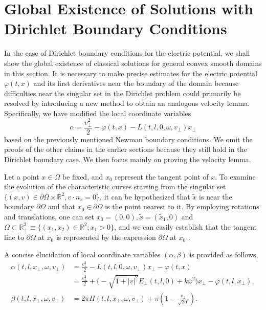 \documentclass[11pt,reqno]{amsart}%
\theoremstyle{definition}
\theoremstyle{remark}
\begin{document}
\section{Global Existence of Solutions with Dirichlet Boundary Conditions}

In the case of Dirichlet boundary conditions for the electric potential, we shall show the global existence of classical solutions for general convex smooth domains in this section. It is necessary to make precise estimates for the electric potential $ \varphi(t,x)$ and its first derivatives near the boundary of the domain because difficulties near the singular set in the Dirichlet problem could primarily be resolved by introducing a new method to obtain an analogous velocity lemma. Specifically, we have modified the local coordinate variables 
$$\alpha=\frac{v_{\bot}^{2}}{2}-\varphi(t,x)-L(t,l,0,\omega,v_{\bot})x_{\bot}$$ based on the previously mentioned Newman boundary conditions. We omit the proofs of the other claims in the earlier sections because they still hold in the Dirichlet boundary case. We then focus mainly on proving the velocity lemma.

Let a point $x\in\Omega$ be fixed, and $x_{0}$ represent the tangent point of $x$. To examine the evolution of the characteristic curves starting from  the singular set  $\{(x,v)\in \partial\Omega\times \mathbb{R}^{2}, v\cdot n_{x}=0\}$, it can be hypothesized that  $\tilde{x}$ is near the boundary $\partial\Omega$ and that $x_{0}\in\partial\Omega$ is the point nearest to it. By employing rotations and translations, one can set $x_{0}=(0,0), \tilde{x}=(\tilde{x}_{1},0)$ and $\Omega \subset \mathbb{R}^{2}_{+}\equiv \{(x_{1},x_{2})\in \mathbb{R}^{2}; x_{1}>0\}$,  and we can easily establish that the tangent line to $\partial\Omega$ at $x_{0}$  is represented by the expression $\partial\Omega$ at $x_{0}$ .

A concise elucidation of local coordinate variables $(\alpha,\beta)$ is provided as follows,
\begin{align}
\alpha(t,l,x_{\bot},\omega,v_{\bot})&=\frac{v_{\bot}^{2}}{2}-L(t,l,0,\omega,v_{\bot})x_{\bot}-\varphi(t,x)\nonumber\\
&=\frac{v_{\bot}^{2}}{2}+\big(-\sqrt{1+|v|^{2}}E_{\bot}(t,l,0)+k\omega^{2}\big)x_{\bot}-\varphi(t,l,x_{\bot}),\label{v7.1}\\
\beta(t, l,  x_{\bot}, \omega, v_{\bot})&=2\pi H(t,l,x_{\bot},\omega,v_{\bot})+\pi (1-\frac{v_{\bot}}{\sqrt{2\alpha}}).\label{v7.2}
\end{align}
\end{document}

